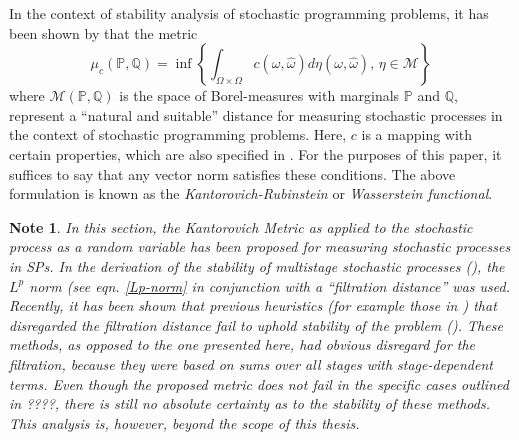 \documentclass[a4paper, 12pt] {article}
\newtheorem*{Note}{Note}
\begin{document}
In the context of stability analysis of stochastic programming problems, it has been shown by \cite{Dupacova2003} that the metric 
\begin{equation}
  \label{eq:define_infinitedim_kantorovich}
  \mu_c(\mathbb{P}, \mathbb{Q}) = \inf\left\{\int_{\Omega\times\Omega}c(\omega, \hat{\omega})d\eta(\omega,\hat{\omega}),\, \eta\in\mathcal{M}\right\}
\end{equation}
where $\mathcal{M}(\mathbb{P, Q})$ is the space of Borel-measures with marginals $\mathbb{P}$ and $\mathbb{Q}$, represent a  ``natural and suitable'' distance for measuring stochastic processes in the context of stochastic programming problems. Here, $c$ is a mapping with certain properties, which are also specified in \cite{Dupacova2003}. For the purposes of this paper, it suffices to say that any vector norm satisfies these conditions. The above formulation is known as the \textit{Kantorovich-Rubinstein} or \textit{Wasserstein functional}.

\begin{Note}
  In this section, the Kantorovich Metric as applied to the stochastic process as a random variable has been proposed for measuring stochastic processes in SPs. In the derivation of the stability of multistage stochastic processes (\cite{Heitsch2010}), the $L^p$ norm (see eqn. \ref{Lp-norm} in conjunction with a ``filtration distance'' was used. Recently, it has been shown that previous heuristics (for example those in \cite{Dupacova2003}) that disregarded the filtration distance fail to uphold stability of the problem (\cite{Heitsch2009a}). These methods, as opposed to the one presented here, had obvious disregard for the filtration, because they were based on sums over all stages with stage-dependent terms. Even though the proposed metric does not fail in the specific cases outlined in \cite{Heitsch2009a}????, there is still no absolute certainty as to the stability of these methods. This analysis is, however, beyond the scope of this thesis.
\end{Note}
\end{document}
